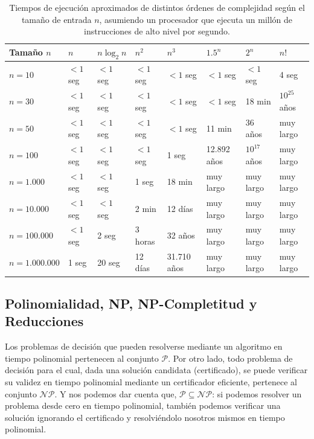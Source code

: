 \begin{table}[H]
    \centering
    \caption{Tiempos de ejecución aproximados de distintos órdenes de complejidad según el tamaño de entrada $n$, asumiendo un procesador que ejecuta un millón de instrucciones de alto nivel por segundo.}
    \renewcommand{\arraystretch}{1.3}
    \begin{tabular}{|l|l|l|l|l|l|l|l|}
    \hline
        Tamaño $n$ & $n$ & $n\log_{2}{n}$ & $n^{2}$ & $n^{3}$ & $1.5^{n}$ & $2^{n}$ & $n!$ \\ \hline
        $n = 10$ & $< 1$ seg & $< 1$ seg & $< 1$ seg & $< 1$ seg & $< 1$ seg & $< 1$ seg & 4 seg \\ \hline
        $n = 30$ & $< 1$ seg & $< 1$ seg & $< 1$ seg & $< 1$ seg & $< 1$ seg & 18 min & $10^{25}$ años \\ \hline
        $n = 50$ & $< 1$ seg & $< 1$ seg & $< 1$ seg & $< 1$ seg & 11 min & 36 años & muy largo \\ \hline
        $n = 100$ & $< 1$ seg & $< 1$ seg & $< 1$ seg & 1 seg & 12.892 años & $10^{17}$ años & muy largo \\ \hline
        $n = 1.000$ & $< 1$ seg & $< 1$ seg & 1 seg & 18 min & muy largo & muy largo & muy largo \\ \hline
        $n = 10.000$ & $< 1$ seg & $< 1$ seg & 2 min & 12 días & muy largo & muy largo & muy largo \\ \hline
        $n = 100.000$ & $< 1$ seg & 2 seg & 3 horas & 32 años & muy largo & muy largo & muy largo \\ \hline
        $n = 1.000.000$ & 1 seg & 20 seg & 12 días & 31.710 años & muy largo & muy largo & muy largo \\ \hline
    \end{tabular}
    \label{table:tabla1}
\end{table}

\subsection{Polinomialidad, NP, NP-Completitud y Reducciones}

Los problemas de decisión que pueden resolverse mediante un algoritmo en tiempo polinomial pertenecen al conjunto $\mathcal{P}$. Por otro lado, todo problema de decisión para el cual, dada una solución candidata (certificado), se puede verificar su validez en tiempo polinomial mediante un certificador eficiente, pertenece al conjunto $\mathcal{NP}$. Y nos podemos dar cuenta que, $\mathcal{P} \subseteq \mathcal{NP}$: si podemos resolver un problema desde cero en tiempo polinomial, también podemos verificar una solución ignorando el certificado y resolviéndolo nosotros mismos en tiempo polinomial.

